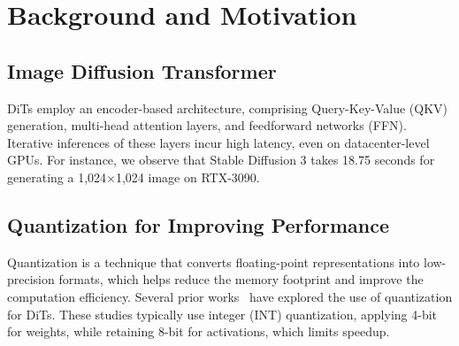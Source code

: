 \IEEEpubidadjcol
\vspace{-0.6cm}
\section{Background and Motivation}
\subsection{Image Diffusion Transformer}
%
DiTs employ an encoder-based architecture, comprising Query-Key-Value (QKV) generation, multi-head attention layers, and feedforward networks (FFN). 
%
Iterative inferences of these layers incur high latency, even on datacenter-level GPUs.
%
For instance, we observe that Stable Diffusion 3 takes 18.75 seconds for generating a 1,024$\times$1,024 image on RTX-3090.

\vspace{-0.4cm}
\subsection{Quantization for Improving Performance}
\vspace{-0.1cm}
Quantization is a technique that converts floating-point representations into low-precision formats, which helps reduce the memory footprint and improve the computation efficiency.
Several prior works~\cite{ptq4dit, qdit, viditq} have explored the use of quantization for DiTs.
%
These studies typically use integer (INT) quantization, applying 4-bit for weights, while retaining 8-bit for activations, which limits speedup.

